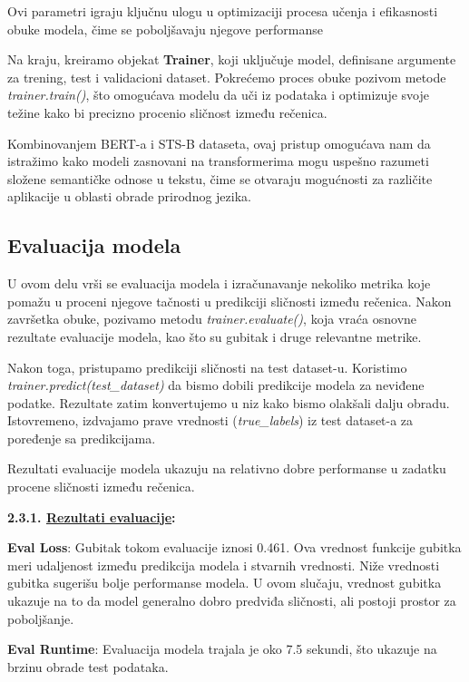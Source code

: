 \documentclass{article}
\begin{document}
Ovi parametri igraju ključnu ulogu u optimizaciji procesa učenja i efikasnosti obuke modela, čime se poboljšavaju njegove performanse


Na kraju, kreiramo objekat \textbf{Trainer}, koji uključuje model, definisane argumente za trening, test i validacioni dataset. Pokrećemo proces obuke pozivom metode \textit{trainer.train()}, što omogućava modelu da uči iz podataka i optimizuje svoje težine kako bi precizno procenio sličnost između rečenica.

Kombinovanjem BERT-a i STS-B dataseta, ovaj pristup omogućava nam da istražimo kako modeli zasnovani na transformerima mogu uspešno razumeti složene semantičke odnose u tekstu, čime se otvaraju mogućnosti za različite aplikacije u oblasti obrade prirodnog jezika.

\subsection{Evaluacija modela}
U ovom delu vrši se evaluacija modela i izračunavanje nekoliko metrika koje pomažu u proceni njegove tačnosti u predikciji sličnosti između rečenica. Nakon završetka obuke, pozivamo metodu \textit{trainer.evaluate()}, koja vraća osnovne rezultate evaluacije modela, kao što su gubitak i druge relevantne metrike.

Nakon toga, pristupamo predikciji sličnosti na test dataset-u. Koristimo \textit{trainer.predict(test\_dataset)} da bismo dobili predikcije modela za neviđene podatke. Rezultate zatim konvertujemo u niz kako bismo olakšali dalju obradu. Istovremeno, izdvajamo prave vrednosti (\textit{true\_labels}) iz test dataset-a za poređenje sa predikcijama.

Rezultati evaluacije modela ukazuju na relativno dobre performanse u zadatku procene sličnosti između rečenica.

\newpage
\textbf{2.3.1. \underline{Rezultati evaluacije}:}
\vspace{1em}

\textbf{Eval Loss}:
Gubitak tokom evaluacije iznosi 0.461. Ova vrednost funkcije gubitka meri udaljenost između predikcija modela i stvarnih vrednosti. Niže vrednosti gubitka sugerišu bolje performanse modela. U ovom slučaju, vrednost gubitka ukazuje na to da model generalno dobro predviđa sličnosti, ali postoji prostor za poboljšanje.


\textbf{Eval Runtime}: Evaluacija modela trajala je oko 7.5 sekundi, što ukazuje na brzinu obrade test podataka.
\end{document}
